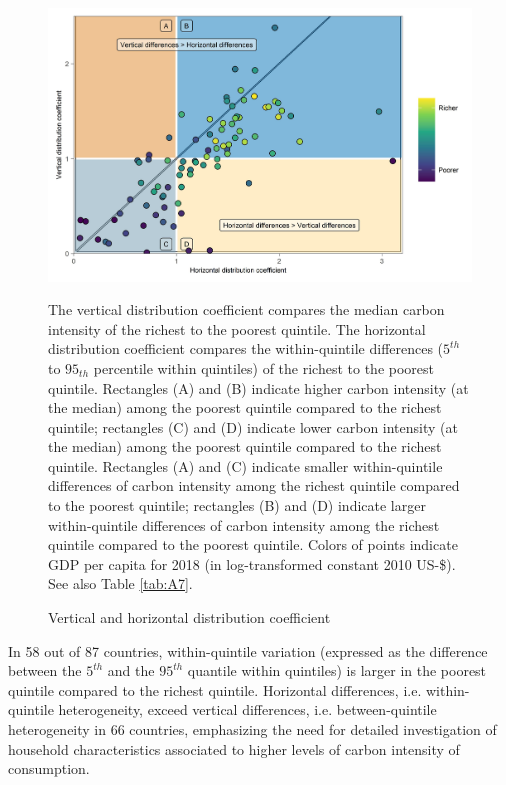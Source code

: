 \documentclass[12pt, a4paper]{article}
\newenvironment{subcaption}
{\strut
\vspace{-5pt}
\begin{minipage}[b]{0.9\textwidth}
  \hspace*{-\parindent}
  \footnotesize}
 {\end{minipage}}
\begin{document}
\begin{figure}[ht!]
    \centering
    \includegraphics{Figure 2/Figure_2_2017}
    \caption{Vertical and horizontal distribution coefficient}
    \label{fig:fig_2}
    \begin{subcaption}
    The vertical distribution coefficient compares the median carbon intensity of the richest to the poorest quintile. The horizontal distribution coefficient compares the within-quintile differences ($5^{th}$ to $95_{th}$ percentile within quintiles) of the richest to the poorest quintile. Rectangles (A) and (B) indicate higher carbon intensity (at the median) among the poorest quintile compared to the richest quintile; rectangles (C) and (D) indicate lower carbon intensity (at the median) among the poorest quintile compared to the richest quintile. Rectangles (A) and (C) indicate smaller within-quintile differences of carbon intensity among the richest quintile compared to the poorest quintile; rectangles (B) and (D) indicate larger within-quintile differences of carbon intensity among the richest quintile compared to the poorest quintile. Colors of points indicate GDP per capita for 2018 (in log-transformed constant 2010 US-\$). See also Table \ref{tab:A7}.
    \end{subcaption}
\end{figure}

In 58 out of 87 countries, within-quintile variation (expressed as the difference between the $5^{th}$ and the $95^{th}$ quantile within quintiles) is larger in the poorest quintile compared to the richest quintile. Horizontal differences, i.e. within-quintile heterogeneity, exceed vertical differences, i.e. between-quintile heterogeneity in 66 countries, emphasizing the need for detailed investigation of household characteristics associated to higher levels of carbon intensity of consumption.
\end{document}
